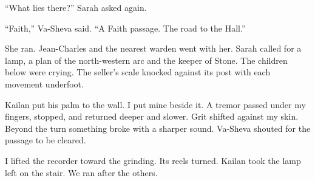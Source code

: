 ``What lies there?'' Sarah asked again.\par

``Faith,'' Va-Sheva said. ``A Faith passage. The road to the Hall.''\par

She ran. Jean-Charles and the nearest warden went with her. Sarah called for a lamp, a plan of the north-western arc and the keeper of Stone. The children below were crying. The seller's scale knocked against its post with each movement underfoot.\par

Kailan put his palm to the wall. I put mine beside it. A tremor passed under my fingers, stopped, and returned deeper and slower. Grit shifted against my skin. Beyond the turn something broke with a sharper sound. Va-Sheva shouted for the passage to be cleared.\par

I lifted the recorder toward the grinding. Its reels turned. Kailan took the lamp left on the stair. We ran after the others.\par
